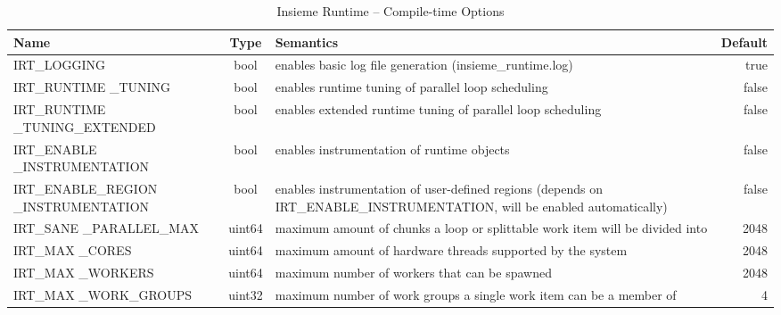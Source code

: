 \begin{table}[htbp] \small
	\centering
    \begin{tabular}{|p{4cm}|c|p{6cm}|r|}
        \hline
        Name                              & Type   & Semantics                                                                      & Default \\ \hline \hline
        IRT\_LOGGING                       & bool   & enables basic log file generation (insieme\_runtime.log)                                                                & true          \\ \hline
        IRT\_RUNTIME \_TUNING                & bool   & enables runtime tuning of parallel loop scheduling                                                                     & false         \\ \hline
        IRT\_RUNTIME \_TUNING\_EXTENDED       & bool   & enables extended runtime tuning of parallel loop scheduling                                                            & false         \\ \hline
        IRT\_ENABLE \_INSTRUMENTATION        & bool   & enables instrumentation of runtime objects                                                                             & false         \\ \hline
        IRT\_ENABLE\_REGION \_INSTRUMENTATION & bool   & enables instrumentation of user-defined regions (depends on IRT\_ENABLE\_INSTRUMENTATION, will be enabled automatically) & false         \\ \hline
        IRT\_SANE \_PARALLEL\_MAX             & uint64 & maximum amount of chunks a loop or splittable work item will be divided into                                           & 2048          \\ \hline
        IRT\_MAX \_CORES                     & uint64 & maximum amount of hardware threads supported by the system                                                             & 2048          \\ \hline
        IRT\_MAX \_WORKERS                   & uint64 & maximum number of workers that can be spawned                                                                          & 2048          \\ \hline
        IRT\_MAX \_WORK\_GROUPS               & uint32 & maximum number of work groups a single work item can be a member of                                                    & 4             \\ \hline
  \end{tabular}
	\caption{Insieme Runtime -- Compile-time Options}
	\label{tab:runtime:options:compile}
\end{table}



